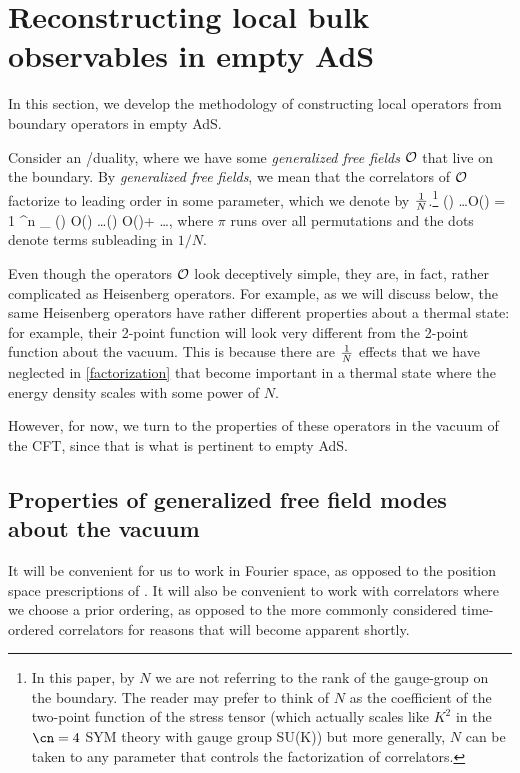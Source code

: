 \section{Reconstructing local bulk observables in empty AdS \label{sec:emptyads}}
In this section, we develop the methodology of constructing local 
operators from boundary operators in empty AdS. 

Consider an \ads[d+1]/\cft[d] duality, where we have some {\em generalized free fields} ${\cal O}$ that live on the boundary. By {\em generalized free fields}, we mean that the correlators of ${\cal O}$ factorize to leading order in some parameter, which we denote by ${1 \over N}$.\footnote{In this paper, by $N$ we are not referring to the rank of the gauge-group on the boundary. The reader may prefer to think of $N$ as the coefficient of the two-point function of the stress tensor 
 (which actually scales like $K^2$ in the ${\cn = 4}$ SYM theory with gauge group SU(K)) but more generally, $N$ can be taken
to any parameter that controls the factorization of correlators.}
\be
\label{factorization}
() \ldots {\cal O}() \rvac= {1 ^n} \sum_{\pi} () {\cal O}() \rvac \ldots {}() {\cal O}()\rvac + \ldots,
\ee
where $\pi$ runs over all permutations and the dots denote terms subleading in $1/N$.

Even though the operators ${\cal O}$ look deceptively simple, they are, in fact, rather complicated as Heisenberg operators. For example, as we will discuss below, the same Heisenberg operators have rather different properties about a thermal state: for example, their  
2-point function will look very different from the 2-point function about the vacuum. This is because there are ${1 \over N}$ effects that we have neglected in \eqref{factorization} that become important in a thermal state where the energy density scales with some power of $N$. 

However, for now, we turn to the properties of these operators in the vacuum of the CFT, since that is what is pertinent to empty AdS.
\subsection{Properties of generalized free field modes about the vacuum}
\label{subsec:freevac}
It will be convenient for us to work in Fourier space, as opposed to the position space prescriptions of \cite{Banks:1998dd, Bena:1999jv, Hamilton:2005ju, Hamilton:2006fh,Hamilton:2006az,Hamilton:2007wj,Heemskerk:2012mn,Bousso:2012mh}.
It will also be convenient to work with correlators where we choose a prior ordering, as opposed to the more commonly considered time-ordered correlators for reasons that will become apparent shortly. 

